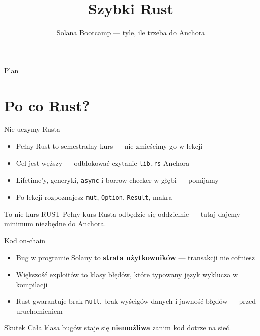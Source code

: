 

\usepackage[utf8]{inputenc}
\usepackage[T1]{fontenc}

\title{Szybki Rust}
\subtitle{Solana Bootcamp --- tyle, ile trzeba do Anchora}
\author{}



\maketitleframe

\begin{frame}{Plan}
  \tableofcontents
\end{frame}

\section{Po co Rust?}

\begin{frame}{Nie uczymy Rusta}
  \begin{itemize}
    \item Pełny Rust to semestralny kurs --- nie zmieścimy go w lekcji
    \item Cel jest węższy --- odblokować czytanie \texttt{lib.rs} Anchora
    \item Lifetime'y, generyki, \texttt{async} i borrow checker w głębi --- pomijamy
    \item Po lekcji rozpoznajesz \texttt{mut}, \texttt{Option}, \texttt{Result}, makra
  \end{itemize}
  \vspace{0.25cm}
  \begin{alertblock}{To nie kurs RUST}
    Pełny kurs Rusta odbędzie się oddzielnie --- tutaj dajemy minimum
    niezbędne do Anchora.
  \end{alertblock}
\end{frame}

\begin{frame}{Kod on-chain}
  \begin{itemize}
    \item Bug w programie Solany to \textbf{strata użytkowników} --- transakcji nie cofniesz
    \item Większość exploitów to klasy błędów, które typowany język wyklucza w kompilacji
    \item Rust gwarantuje brak \texttt{null}, brak wyścigów danych i jawność błędów --- przed uruchomieniem
  \end{itemize}
  \vspace{0.3cm}
  \begin{alertblock}{Skutek}
    Cała klasa bugów staje się \textbf{niemożliwa} zanim kod dotrze na sieć.
  \end{alertblock}
\end{frame}

